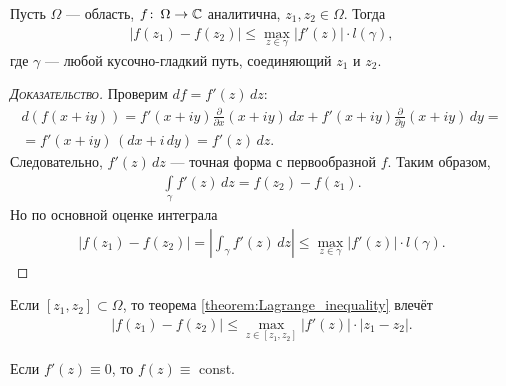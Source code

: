 \documentclass[../complex-analysis.tex]{subfiles}
\begin{document}
\begin{thm}
 \label{theorem:Lagrange_inequality}
 Пусть $ \Omega $ --- область, $ f \colon\, \Omega \to \mathbb{C} $ аналитична, $ z_1, z_2 \in \Omega $. Тогда
 \begin{align*}
  \left| f(z_1) - f(z_2) \right| \leqslant \max_{z \in \gamma} \left| f'(z) \right| \cdot l(\gamma),
 \end{align*} где $ \gamma $ --- любой кусочно-гладкий путь, соединяющий $ z_1 $ и $ z_2 $.
\end{thm}
\begin{proof}[\normalfont\textsc{Доказательство}]
 Проверим $ df = f'(z) \, dz$:
 \begin{align*}
  d(f(x+iy)) = f'(x+iy) \frac{\partial}{\partial x}(x+iy)\,dx + f'(x +iy) \frac{\partial}{\partial y}(x+iy)\,dy = \\
  =f'(x+iy)\,(dx + i\,dy) = f'(z)\,dz.
 \end{align*} Следовательно, $ f'(z)\,dz $ --- точная форма с первообразной $ f $. Таким образом,
 \begin{align*}
  \int\limits_{\gamma}  f'(z)\,dz = f(z_2) - f(z_1).
 \end{align*} Но по основной оценке интеграла
 \begin{align*}
  \left| f(z_1) - f(z_2) \right| = \left| \int_{\gamma} f'(z)\,dz   \right| \leqslant \max_{z \in \gamma} \left| f'(z) \right| \cdot l(\gamma).
 \end{align*} 
\end{proof}
\begin{remrk}
  Если $ [z_1, z_2] \subset \Omega $, то теорема \eqref{theorem:Lagrange_inequality} влечёт\
 \begin{align*}
  \left| f(z_1) - f(z_2) \right| \leqslant \max_{z \in [z_1, z_2]} \left| f'(z) \right| \cdot \left| z_1 - z_2 \right|.
 \end{align*} 
\end{remrk}
\begin{remrk}
    \label{remark:zero_derivative_analytical}
	Если $f'(z) \equiv 0$, то $f(z) \equiv$ const.  
\end{remrk}
\end{document}
